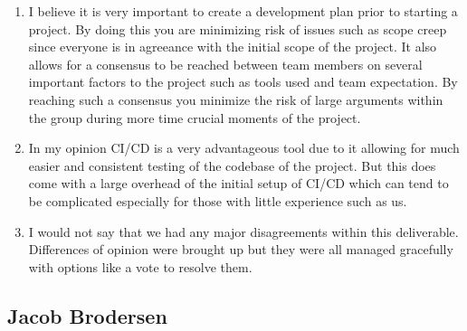 \documentclass{article}
\begin{document}
\begin{enumerate}
    \item I believe it is very important to create a development plan prior to starting a project.
    By doing this you are minimizing risk of issues such as scope creep since everyone is in agreeance with the initial scope of the project.
    It also allows for a consensus to be reached between team members on several important factors to the project such as tools used and team expectation.
    By reaching such a consensus you minimize the risk of large arguments within the group during more time crucial moments of the project.
    \item In my opinion CI/CD is a very advantageous tool due to it allowing for much easier and consistent testing of the codebase of the project.
    But this does come with a large overhead of the initial setup of CI/CD which can tend to be complicated especially for those with little experience such as us.
    \item I would not say that we had any major disagreements within this deliverable.
    Differences of opinion were brought up but they were all managed gracefully with options like a vote to resolve them.
\end{enumerate}

\subsection*{Jacob Brodersen}
\end{document}
